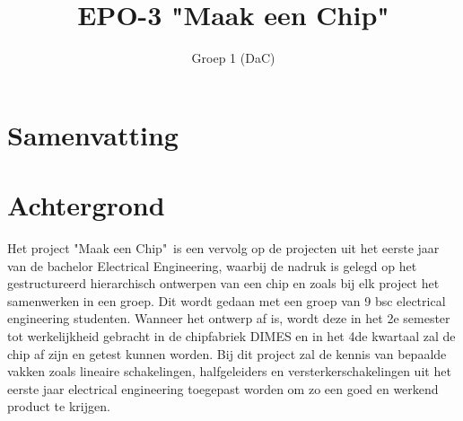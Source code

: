 \documentclass{article}
\title{EPO-3 "Maak een Chip"}
\author{Groep 1 (DaC)}
\date{}
\begin{document}
\maketitle
{}
\vspace{80 mm}
\section*{Samenvatting}
\newpage
\setlength{\cftbeforetoctitleskip}{-3em}

\tableofcontents
\clearpage

\section{Achtergrond}
Het project "Maak een Chip"\ is een vervolg op de projecten uit het eerste jaar van de bachelor Electrical Engineering, waarbij de nadruk is gelegd op het gestructureerd hierarchisch ontwerpen van een chip en zoals bij elk project het samenwerken in een groep. Dit wordt gedaan met een groep van 9 bsc electrical engineering studenten. Wanneer het ontwerp af is, wordt deze in het 2e semester tot werkelijkheid gebracht in de chipfabriek DIMES en in het 4de kwartaal zal de chip af zijn en getest kunnen worden. Bij dit project zal de kennis van bepaalde vakken zoals lineaire schakelingen, halfgeleiders en versterkerschakelingen uit het eerste jaar electrical engineering toegepast worden om zo een goed en werkend product te krijgen.
\end{document}
